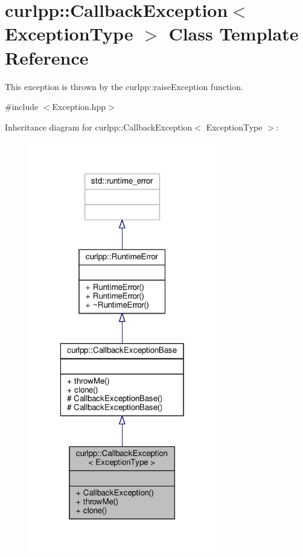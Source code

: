 \hypertarget{classcurlpp_1_1CallbackException}{\section{curlpp\-:\-:Callback\-Exception$<$ Exception\-Type $>$ Class Template Reference}
\label{classcurlpp_1_1CallbackException}
}


This exception is thrown by the curlpp\-::raise\-Exception function.  




{\ttfamily \#include $<$Exception.\-hpp$>$}



Inheritance diagram for curlpp\-:\-:Callback\-Exception$<$ Exception\-Type $>$\-:
\nopagebreak
\begin{figure}[H]
\begin{center}
\leavevmode
\includegraphics[width=232pt]{classcurlpp_1_1CallbackException__inherit__graph}
\end{center}
\end{figure}


